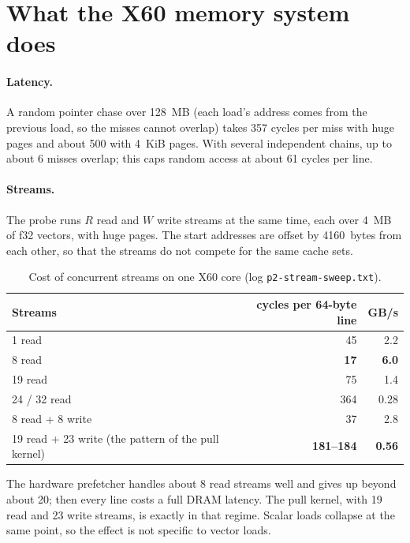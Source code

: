\section{What the X60 memory system does}\label{r03:sec:mem}

\paragraph{Latency.} A random pointer chase over 128~MB (each load's address comes from the
previous load, so the misses cannot overlap) takes 357 cycles per miss with huge pages and
about 500 with 4~KiB pages. With several independent chains, up to about 6 misses overlap;
this caps random access at about 61 cycles per line.

\paragraph{Streams.} The probe runs $R$ read and $W$ write streams at the same time, each over
4~MB of f32 vectors, with huge pages. The start addresses are offset by 4160~bytes from each
other, so that the streams do not compete for the same cache sets.

\begin{table}[htbp]
  \centering\small
  \caption{Cost of concurrent streams on one X60 core (log \texttt{p2-stream-sweep.txt}).}\label{r03:tab:streams}
  \begin{tabular}{@{}lrr@{}}
    \toprule
    \textbf{Streams} & \textbf{cycles per 64-byte line} & \textbf{GB/s}\\
    \midrule
    1 read & 45 & 2.2\\
    8 read & \textbf{17} & \textbf{6.0}\\
    19 read & 75 & 1.4\\
    24 / 32 read & 364 & 0.28\\
    8 read + 8 write & 37 & 2.8\\
    19 read + 23 write (the pattern of the pull kernel) & \textbf{181--184} & \textbf{0.56}\\
    \bottomrule
  \end{tabular}
\end{table}

The hardware prefetcher handles about 8 read streams well and gives up beyond about 20; then
every line costs a full DRAM latency. The pull kernel, with 19 read and 23 write streams, is
exactly in that regime. Scalar loads collapse at the same point, so the effect is not specific
to vector loads.

